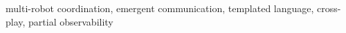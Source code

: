 multi-robot coordination, emergent communication, templated language, cross-play, partial observability
